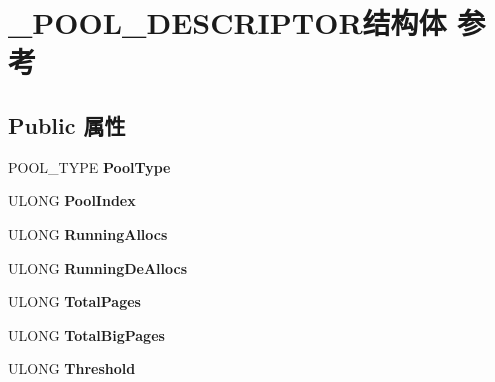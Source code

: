 \hypertarget{struct___p_o_o_l___d_e_s_c_r_i_p_t_o_r}{}\section{\+\_\+\+P\+O\+O\+L\+\_\+\+D\+E\+S\+C\+R\+I\+P\+T\+O\+R结构体 参考}
\label{struct___p_o_o_l___d_e_s_c_r_i_p_t_o_r}
\subsection*{Public 属性}
\begin{DoxyCompactItemize}
\item 
\mbox{\label{struct___p_o_o_l___d_e_s_c_r_i_p_t_o_r_a1d7cf60acf99c7e4d6bac6d050cfb2a6}} 
P\+O\+O\+L\+\_\+\+T\+Y\+PE {\bfseries Pool\+Type}
\item 
\mbox{\label{struct___p_o_o_l___d_e_s_c_r_i_p_t_o_r_ac11300041b259c2ed79e3494da33a124}} 
U\+L\+O\+NG {\bfseries Pool\+Index}
\item 
\mbox{\label{struct___p_o_o_l___d_e_s_c_r_i_p_t_o_r_a78765faa914c3ee8571c56eb49d6188a}} 
U\+L\+O\+NG {\bfseries Running\+Allocs}
\item 
\mbox{\label{struct___p_o_o_l___d_e_s_c_r_i_p_t_o_r_aca8b231c34b0cc7c8fc5e91529068f45}} 
U\+L\+O\+NG {\bfseries Running\+De\+Allocs}
\item 
\mbox{\label{struct___p_o_o_l___d_e_s_c_r_i_p_t_o_r_a7bd408e6ba328b36458087be105b6be5}} 
U\+L\+O\+NG {\bfseries Total\+Pages}
\item 
\mbox{\label{struct___p_o_o_l___d_e_s_c_r_i_p_t_o_r_ae9ef0d063a585d938c639f79a7919892}} 
U\+L\+O\+NG {\bfseries Total\+Big\+Pages}
\item 
\mbox{\label{struct___p_o_o_l___d_e_s_c_r_i_p_t_o_r_a59f32fc769bdb272e0569dd9b1936c8f}} 
U\+L\+O\+NG {\bfseries Threshold}
\item 
\mbox{\label{struct___p_o_o_l___d_e_s_c_r_i_p_t_o_r_af57760cb6de54845c571829d4130a4f6}} 

\end{DoxyCompactItemize}
